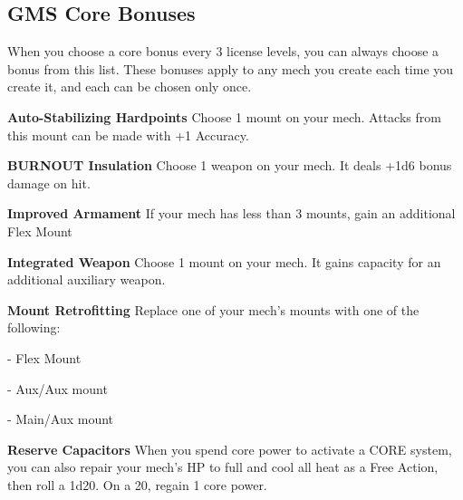\subsection{GMS Core Bonuses}
When you choose a core bonus every 3 license levels, you can always choose a bonus from this list. These bonuses apply to any mech you create each time you create it, and each can be chosen only once.


\textbf{Auto-Stabilizing Hardpoints}
Choose 1 mount on your mech. Attacks from this mount can be made with +1 Accuracy.


\textbf{BURNOUT Insulation}
Choose 1 weapon on your mech. It deals +1d6 bonus damage on hit.


\textbf{Improved Armament}
If your mech has less than 3 mounts, gain an additional Flex Mount


\textbf{Integrated Weapon}
Choose 1 mount on your mech. It gains capacity for an additional auxiliary weapon.


\textbf{Mount Retrofitting}
Replace one of your mech's mounts with one of the following:

	       - Flex Mount

	       - Aux/Aux mount

	       - Main/Aux mount


\textbf{Reserve Capacitors}
When you spend core power to activate a CORE system, you can also repair your mech's HP to full and cool all heat as a Free Action, then roll a 1d20. On a 20, regain 1 core power.

